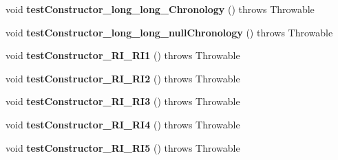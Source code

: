 \begin{DoxyCompactItemize}
\item 
\hypertarget{classorg_1_1joda_1_1time_1_1_test_interval___constructors_a9d6799797ddf483fe01cdf8bec336ccd}{void {\bfseries test\-Constructor\-\_\-long\-\_\-long\-\_\-\-Chronology} ()  throws Throwable }\label{classorg_1_1joda_1_1time_1_1_test_interval___constructors_a9d6799797ddf483fe01cdf8bec336ccd}

\item 
\hypertarget{classorg_1_1joda_1_1time_1_1_test_interval___constructors_a61004e7afdb71a7fb20019a158bf5452}{void {\bfseries test\-Constructor\-\_\-long\-\_\-long\-\_\-null\-Chronology} ()  throws Throwable }\label{classorg_1_1joda_1_1time_1_1_test_interval___constructors_a61004e7afdb71a7fb20019a158bf5452}

\item 
\hypertarget{classorg_1_1joda_1_1time_1_1_test_interval___constructors_a33641f2b3c47c710c5e6ccc63741138a}{void {\bfseries test\-Constructor\-\_\-\-R\-I\-\_\-\-R\-I1} ()  throws Throwable }\label{classorg_1_1joda_1_1time_1_1_test_interval___constructors_a33641f2b3c47c710c5e6ccc63741138a}

\item 
\hypertarget{classorg_1_1joda_1_1time_1_1_test_interval___constructors_a07cf689b89768b7fe5c24bd1bb5ded4d}{void {\bfseries test\-Constructor\-\_\-\-R\-I\-\_\-\-R\-I2} ()  throws Throwable }\label{classorg_1_1joda_1_1time_1_1_test_interval___constructors_a07cf689b89768b7fe5c24bd1bb5ded4d}

\item 
\hypertarget{classorg_1_1joda_1_1time_1_1_test_interval___constructors_a611882ba71fb68321fb102bb426cd3c4}{void {\bfseries test\-Constructor\-\_\-\-R\-I\-\_\-\-R\-I3} ()  throws Throwable }\label{classorg_1_1joda_1_1time_1_1_test_interval___constructors_a611882ba71fb68321fb102bb426cd3c4}

\item 
\hypertarget{classorg_1_1joda_1_1time_1_1_test_interval___constructors_a8912e4c3bba11b4443549bad424dc505}{void {\bfseries test\-Constructor\-\_\-\-R\-I\-\_\-\-R\-I4} ()  throws Throwable }\label{classorg_1_1joda_1_1time_1_1_test_interval___constructors_a8912e4c3bba11b4443549bad424dc505}

\item 
\hypertarget{classorg_1_1joda_1_1time_1_1_test_interval___constructors_aa0d8aef139ea2c6413cbb23d0ca0115d}{void {\bfseries test\-Constructor\-\_\-\-R\-I\-\_\-\-R\-I5} ()  throws Throwable }\label{classorg_1_1joda_1_1time_1_1_test_interval___constructors_aa0d8aef139ea2c6413cbb23d0ca0115d}


\end{DoxyCompactItemize}
